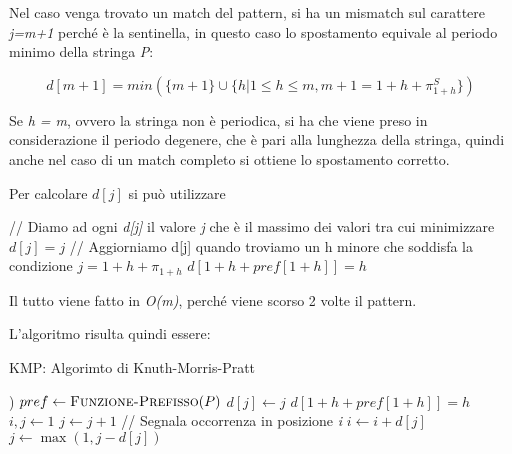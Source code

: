 Nel caso venga trovato un match del pattern, si ha un mismatch sul
carattere \emph{j=m+1} perché è la sentinella, in questo caso lo
spostamento equivale al periodo minimo della stringa \emph{P}:

$$
d[m+1] = min(\{m+1\} \cup \{h | 1 \leq h \leq m, m+1 = 1 + h + \pi_{1+h}^S\})
$$

Se \emph{h = m}, ovvero la stringa non è periodica, si ha che viene
preso in considerazione il periodo degenere, che è pari alla lunghezza
della stringa, quindi anche nel caso di un match completo si ottiene lo
spostamento corretto.

Per calcolare $d[j]$ si può utilizzare

\begin{breakablealgorithm}
	\begin{algorithmic}[1]
			\State // Diamo ad ogni \textit{d[j]} il valore \textit{j} che è il massimo dei valori tra cui minimizzare
			\State $ d[j] = j $
		\EndFor
			\State // Aggiorniamo d[j] quando troviamo un h minore che soddisfa la condizione $j = 1 + h + \pi_{1+h} $
			\State $ d[1 + h + pref[1+h]] = h $
	    \EndFor
	\end{algorithmic}
\end{breakablealgorithm}

Il tutto viene fatto in \emph{O(m)}, perché viene scorso 2 volte il
pattern.

L'algoritmo risulta quindi essere:

\begin{breakablealgorithm}
	\caption{KMP: Algorimto di Knuth-Morris-Pratt}
	\begin{algorithmic}[1]
	)
    \State $ pref \gets \text{\textsc{Funzione-Prefisso}}(P) $
		\State $ d[j] \gets j $
	\EndFor
	    \State $ d[1 + h + pref[1+h]] = h $
    \EndFor
	\State $ i,j \gets 1 $
            \State $ j \gets j + 1 $
        \EndWhile
            \State// Segnala occorrenza in posizione \textit{i}
        \EndIf
        \State $ i \gets i + d[j] $ 
        \State $ j \gets \max(1, j - d[j]) $ 
	 \EndWhile
	 \EndFunction
	\end{algorithmic}
\end{breakablealgorithm}


